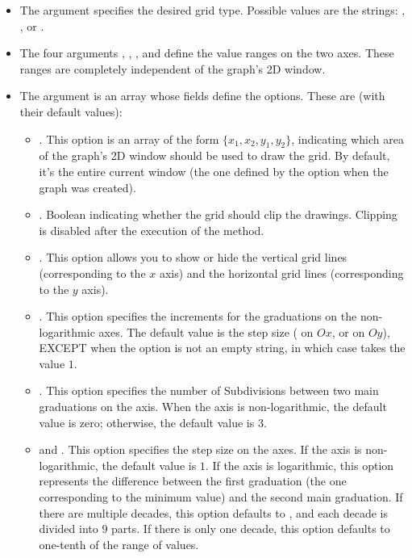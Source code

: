 \begin{itemize}
    \item The argument  specifies the desired grid type. Possible values ​​are the strings: , , or .
    \item The four arguments , , , and  define the value ranges on the two axes. These ranges are completely independent of the graph's 2D window.
    \item The argument  is an array whose fields define the options. These are (with their default values):
    
    \begin{itemize}
    \item {}. This option is an array of the form $\{x_1,x_2,y_1,y_2\}$, indicating which area of ​​the graph's 2D window should be used to draw the grid. By default, it's the entire current window (the one defined by the  option when the graph was created).
    
    \item {}. Boolean indicating whether the grid should clip the drawings. Clipping is disabled after the execution of the  method.
    
    \item {}. This option allows you to show or hide the vertical grid lines (corresponding to the $x$ axis) and the horizontal grid lines (corresponding to the $y$ axis).
    
    \item {}. This option specifies the increments for the graduations on the non-logarithmic axes. The default value is the step size ( on $Ox$, or  on $Oy$), EXCEPT when the  option is not an empty string, in which case  takes the value $1$.
    
    \item {}. This option specifies the number of Subdivisions between two main graduations on the axis. When the axis is non-logarithmic, the default value is zero; otherwise, the default value is $3$.
    
    \item {} and . This option specifies the step size on the axes. If the axis is non-logarithmic, the default value is $1$. If the axis is logarithmic, this option represents the difference between the first graduation (the one corresponding to the minimum value) and the second main graduation. If there are multiple decades, this option defaults to , and each decade is divided into $9$ parts. If there is only one decade, this option defaults to one-tenth of the range of values.
    

\end{itemize}
\end{itemize}
